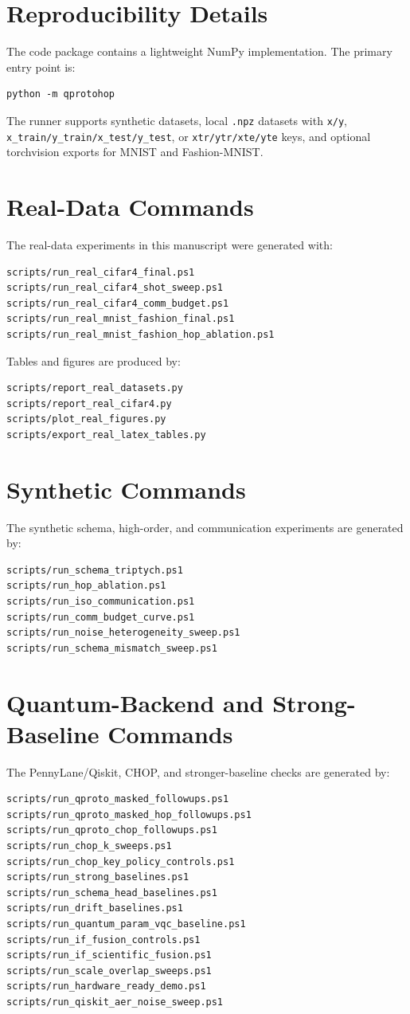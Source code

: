 \section{Reproducibility Details}

The code package contains a lightweight NumPy implementation. The primary entry point is:
\begin{verbatim}
python -m qprotohop
\end{verbatim}
The runner supports synthetic datasets, local \texttt{.npz} datasets with \texttt{x/y}, \texttt{x\_train/y\_train/x\_test/y\_test}, or \texttt{xtr/ytr/xte/yte} keys, and optional torchvision exports for MNIST and Fashion-MNIST.

\section{Real-Data Commands}

The real-data experiments in this manuscript were generated with:
\begin{verbatim}
scripts/run_real_cifar4_final.ps1
scripts/run_real_cifar4_shot_sweep.ps1
scripts/run_real_cifar4_comm_budget.ps1
scripts/run_real_mnist_fashion_final.ps1
scripts/run_real_mnist_fashion_hop_ablation.ps1
\end{verbatim}
Tables and figures are produced by:
\begin{verbatim}
scripts/report_real_datasets.py
scripts/report_real_cifar4.py
scripts/plot_real_figures.py
scripts/export_real_latex_tables.py
\end{verbatim}

\section{Synthetic Commands}

The synthetic schema, high-order, and communication experiments are generated by:
\begin{verbatim}
scripts/run_schema_triptych.ps1
scripts/run_hop_ablation.ps1
scripts/run_iso_communication.ps1
scripts/run_comm_budget_curve.ps1
scripts/run_noise_heterogeneity_sweep.ps1
scripts/run_schema_mismatch_sweep.ps1
\end{verbatim}

\section{Quantum-Backend and Strong-Baseline Commands}

The PennyLane/Qiskit, CHOP, and stronger-baseline checks are generated by:
\begin{verbatim}
scripts/run_qproto_masked_followups.ps1
scripts/run_qproto_masked_hop_followups.ps1
scripts/run_qproto_chop_followups.ps1
scripts/run_chop_k_sweeps.ps1
scripts/run_chop_key_policy_controls.ps1
scripts/run_strong_baselines.ps1
scripts/run_schema_head_baselines.ps1
scripts/run_drift_baselines.ps1
scripts/run_quantum_param_vqc_baseline.ps1
scripts/run_if_fusion_controls.ps1
scripts/run_if_scientific_fusion.ps1
scripts/run_scale_overlap_sweeps.ps1
scripts/run_hardware_ready_demo.ps1
scripts/run_qiskit_aer_noise_sweep.ps1
\end{verbatim}

